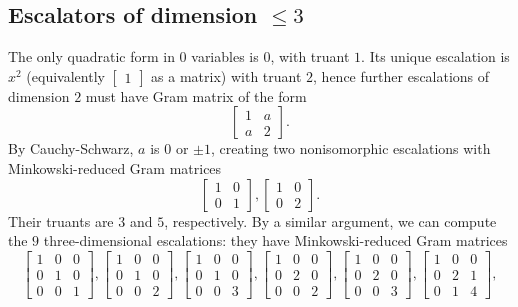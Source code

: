 \documentclass[letterpaper, 12pt]{article}
\begin{document}
\subsection{Escalators of dimension $\le 3$}
The only quadratic form in $0$ variables is $0$, with truant $1$. Its unique escalation is $x^2$ (equivalently $\begin{bmatrix} 1 \end{bmatrix}$ as a matrix) with truant $2$, hence further escalations of dimension $2$ must have Gram matrix of the form
\[\begin{bmatrix} 1 & a \\ a & 2 \end{bmatrix}.\]
By Cauchy-Schwarz, $a$ is $0$ or $\pm 1$, creating two nonisomorphic escalations with Minkowski-reduced Gram matrices
\[\begin{bmatrix} 1 & 0 \\ 0 & 1 \end{bmatrix}, \begin{bmatrix} 1 & 0 \\ 0 & 2 \end{bmatrix}.\]
Their truants are $3$ and $5$, respectively. By a similar argument, we can compute the $9$ three-dimensional escalations: they have Minkowski-reduced Gram matrices
\[\begin{bmatrix} 1 & 0 & 0 \\ 0 & 1 & 0 \\ 0 & 0 & 1 \end{bmatrix}, \begin{bmatrix} 1 & 0 & 0 \\ 0 & 1 & 0 \\ 0 & 0 & 2 \end{bmatrix}, \begin{bmatrix} 1 & 0 & 0 \\ 0 & 1 & 0 \\ 0 & 0 & 3 \end{bmatrix}, \begin{bmatrix} 1 & 0 & 0 \\ 0 & 2 & 0 \\ 0 & 0 & 2 \end{bmatrix}, \begin{bmatrix} 1 & 0 & 0 \\ 0 & 2 & 0 \\ 0 & 0 & 3 \end{bmatrix}, \begin{bmatrix} 1 & 0 & 0 \\ 0 & 2 & 1 \\ 0 & 1 & 4 \end{bmatrix},\]
\end{document}
